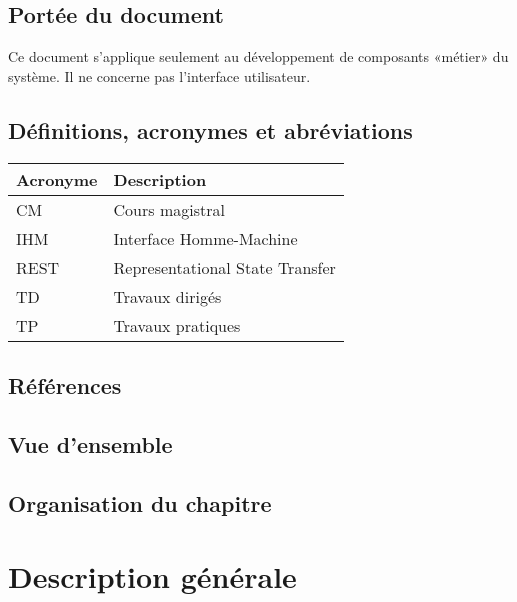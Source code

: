 \subsection{Portée du document}
Ce document s’applique seulement au développement de composants «métier» du système. Il ne concerne pas l’interface utilisateur.

\subsection{Définitions, acronymes et abréviations}


\begin{tabular}{ll}
\toprule
Acronyme & Description \\
\midrule
CM 			& Cours magistral\\
IHM 		& Interface Homme-Machine\\
REST 		& Representational State Transfer\\
TD			& Travaux dirigés\\
TP			& Travaux pratiques\\
\bottomrule
\end{tabular}

\subsection{Références}

\subsection{Vue d’ensemble} 

\subsection{Organisation du chapitre}

\section{Description générale}

